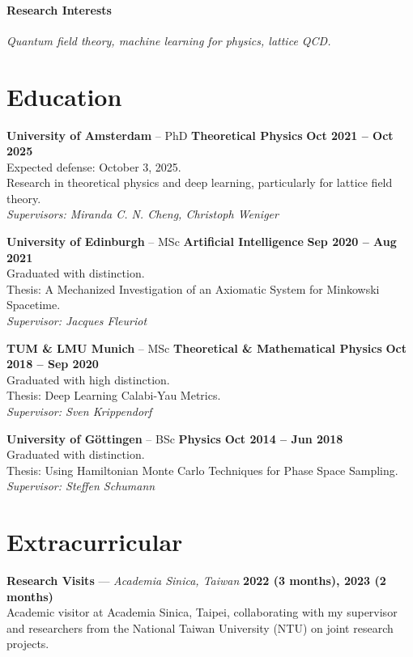 \documentclass[11pt]{article}
\newcommand{\dateright}[1]{\hfill \textbf{#1}}
\begin{document}
\vspace{0.4cm}

\paragraph{Research Interests}
\textit{Quantum field theory, machine learning for physics, lattice QCD.}

\section*{Education}
\noindent
\textbf{University of Amsterdam} -- PhD \textbf{Theoretical Physics} \dateright{Oct 2021 -- Oct 2025} \\
Expected defense: October 3, 2025. \\
Research in theoretical physics and deep learning, particularly for lattice field theory. \\
\textit{Supervisors: Miranda C. N. Cheng, Christoph Weniger}

\vspace{0.2cm}

\noindent
\textbf{University of Edinburgh} -- MSc \textbf{Artificial Intelligence} \dateright{Sep 2020 -- Aug 2021} \\
Graduated with distinction. \\
Thesis: A Mechanized Investigation of an Axiomatic System for Minkowski Spacetime. \\
\textit{Supervisor: Jacques Fleuriot}

\vspace{0.2cm}

\noindent
\textbf{TUM \& LMU Munich} -- MSc \textbf{Theoretical \& Mathematical Physics} \dateright{Oct 2018 -- Sep 2020} \\
Graduated with high distinction. \\
Thesis: Deep Learning Calabi-Yau Metrics. \\
\textit{Supervisor: Sven Krippendorf}

\vspace{0.2cm}

\noindent
\textbf{University of Göttingen} -- BSc \textbf{Physics} \dateright{Oct 2014 -- Jun 2018} \\
Graduated with distinction. \\
Thesis: Using Hamiltonian Monte Carlo Techniques for Phase Space Sampling. \\
\textit{Supervisor: Steffen Schumann}

\section*{Extracurricular}
\noindent
\textbf{Research Visits} — \textit{Academia Sinica, Taiwan} \dateright{2022 (3 months), 2023 (2 months)} \\
Academic visitor at Academia Sinica, Taipei, collaborating with my supervisor and researchers
from the National Taiwan University (NTU) on joint research projects.
\end{document}
